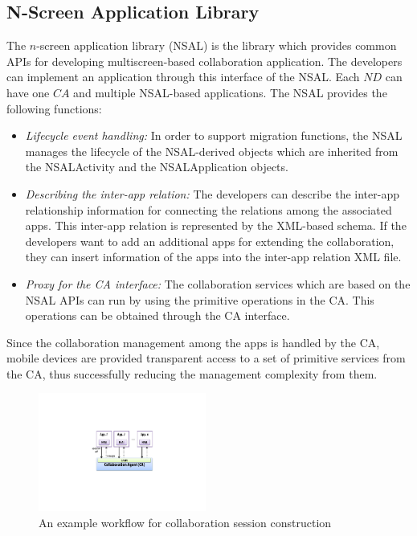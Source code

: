 \documentclass{sig-alternate}
\newcommand{\bi}{\begin{itemize}}
\newcommand{\ei}{\end{itemize}}
\newcommand{\ii}{\item}
\begin{document}
\subsection{N-Screen Application Library}
The $n$-screen application library (NSAL) is the library which provides common APIs for developing multiscreen-based collaboration application. The developers can implement an application through this interface of the NSAL. Each $ND$ can have one $CA$ and multiple NSAL-based applications. The NSAL provides the following functions:
\bi
\ii \textit{Lifecycle event handling: } In order to support migration functions, the NSAL manages the lifecycle of the NSAL-derived objects which are inherited from the NSALActivity and the NSALApplication objects. 
\ii \textit{Describing the inter-app relation:} The developers can describe the inter-app relationship information for connecting the relations among the associated apps. This inter-app relation is represented by the XML-based schema. If the developers want to add an additional apps for extending the collaboration, they can insert information of the apps into the inter-app relation XML file.
\ii \textit{Proxy for the CA interface: } The collaboration services which are based on the NSAL APIs can run by using the primitive operations in the CA. This operations can be obtained through the CA interface. 
\ei 
Since the collaboration management among the apps is handled by the CA, 
mobile devices are provided transparent access to a set of primitive services from the CA, thus successfully reducing the management complexity from them.
    \begin{figure}[htb] %
    \centering
    \includegraphics[width=5.5cm,keepaspectratio]{ca-api}
    \caption{An example workflow for collaboration session construction}
    \label{fig:ca-api}
    \end{figure}
\end{document}
